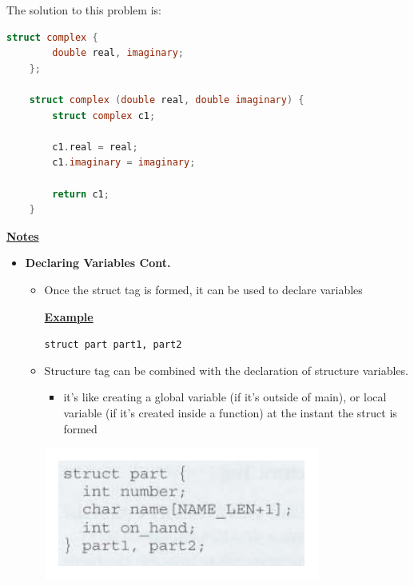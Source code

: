 \documentclass[12pt]{article}
\begin{document}
\begin{enumerate}[1.]
\begin{enumerate}[a)]
        \bigskip

        The solution to this problem is:

        \bigskip

\begin{lstlisting}[language=c]
    struct complex {
        double real, imaginary;
    };

    struct complex (double real, double imaginary) {
        struct complex c1;

        c1.real = real;
        c1.imaginary = imaginary;

        return c1;
    }
\end{lstlisting}

        \bigskip

        \underline{\textbf{Notes}}

        \begin{itemize}
            \item \textbf{Declaring Variables Cont.}

            \begin{itemize}
                \item Once the struct tag is formed, it can be used to declare variables

                \bigskip

                \underline{\textbf{Example}}

                \bigskip

                \texttt{struct part part1, part2}

                \bigskip

                \item Structure tag can be combined with the declaration of structure variables.
                \begin{itemize}
                    \item it's like creating a global variable (if it's outside of main), or local
                    variable (if it's created inside a function) at the instant the struct is formed
                \end{itemize}

                \bigskip

                \begin{center}
                \includegraphics[width=0.6\linewidth]{images/review_7_solution_6.png}
                \end{center}


\end{itemize}
\end{itemize}
\end{enumerate}
\end{enumerate}
\end{document}
